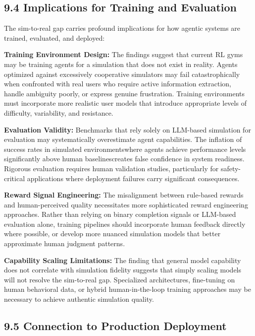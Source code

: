 \subsection{9.4 Implications for Training and Evaluation}

The sim-to-real gap carries profound implications for how agentic systems are trained, evaluated, and deployed:

\textbf{Training Environment Design:} The findings suggest that current RL gyms may be training agents for a simulation that does not exist in reality. Agents optimized against excessively cooperative simulators may fail catastrophically when confronted with real users who require active information extraction, handle ambiguity poorly, or express genuine frustration. Training environments must incorporate more realistic user models that introduce appropriate levels of difficulty, variability, and resistance.

\textbf{Evaluation Validity:} Benchmarks that rely solely on LLM-based simulation for evaluation may systematically overestimate agent capabilities. The inflation of success rates in simulated environmentswhere agents achieve performance levels significantly above human baselinescreates false confidence in system readiness. Rigorous evaluation requires human validation studies, particularly for safety-critical applications where deployment failures carry significant consequences.

\textbf{Reward Signal Engineering:} The misalignment between rule-based rewards and human-perceived quality necessitates more sophisticated reward engineering approaches. Rather than relying on binary completion signals or LLM-based evaluation alone, training pipelines should incorporate human feedback directly where possible, or develop more nuanced simulation models that better approximate human judgment patterns.

\textbf{Capability Scaling Limitations:} The finding that general model capability does not correlate with simulation fidelity suggests that simply scaling models will not resolve the sim-to-real gap. Specialized architectures, fine-tuning on human behavioral data, or hybrid human-in-the-loop training approaches may be necessary to achieve authentic simulation quality.

\subsection{9.5 Connection to Production Deployment}

